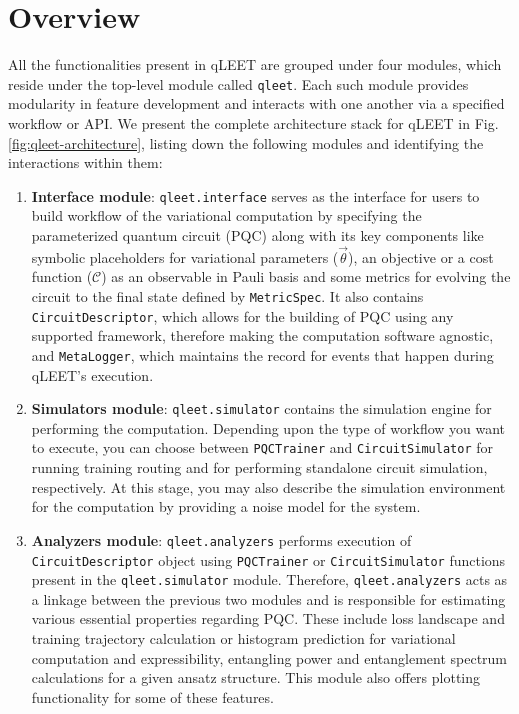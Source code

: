 \section{\label{sec:overview}Overview}

All the functionalities present in qLEET are grouped under four modules, which reside under the top-level module called \texttt{qleet}. Each such module provides modularity in feature development and interacts with one another via a specified workflow or API. We present the complete architecture stack for qLEET in Fig. \ref{fig:qleet-architecture}, listing down the following modules and identifying the interactions within them:

\begin{enumerate}

	\item \textbf{Interface module}: \texttt{qleet.interface} serves as the interface for users to build workflow of the variational computation by specifying the parameterized quantum circuit (PQC) along with its key components like symbolic placeholders for variational parameters ($\vec{\theta}$), an objective or a cost function ($\mathcal{C}$) as an observable in Pauli basis and some metrics for evolving the circuit to the final state defined by \texttt{MetricSpec}. It also contains \texttt{CircuitDescriptor}, which allows for the building of PQC using any supported framework, therefore making the computation software agnostic, and \texttt{MetaLogger}, which maintains the record for events that happen during qLEET's execution. 

	\item \textbf{Simulators module}: \texttt{qleet.simulator} contains the  simulation engine for performing the computation. Depending upon the type of workflow you want to execute, you can choose between \texttt{PQCTrainer} and \texttt{CircuitSimulator} for running training routing and for performing standalone circuit simulation, respectively. At this stage, you may also describe the simulation environment for the computation by providing a noise model for the system. 

	\item \textbf{Analyzers module}: \texttt{qleet.analyzers} performs execution of \texttt{CircuitDescriptor} object using \texttt{PQCTrainer} or \texttt{CircuitSimulator} functions present in the \texttt{qleet.simulator} module. Therefore, \texttt{qleet.analyzers} acts as a linkage between the previous two modules and is responsible for estimating various essential properties regarding PQC. These include loss landscape and training trajectory calculation or histogram prediction for variational computation and expressibility, entangling power and entanglement spectrum calculations for a given ansatz structure. This module also offers plotting functionality for some of these features.
	

\end{enumerate}
